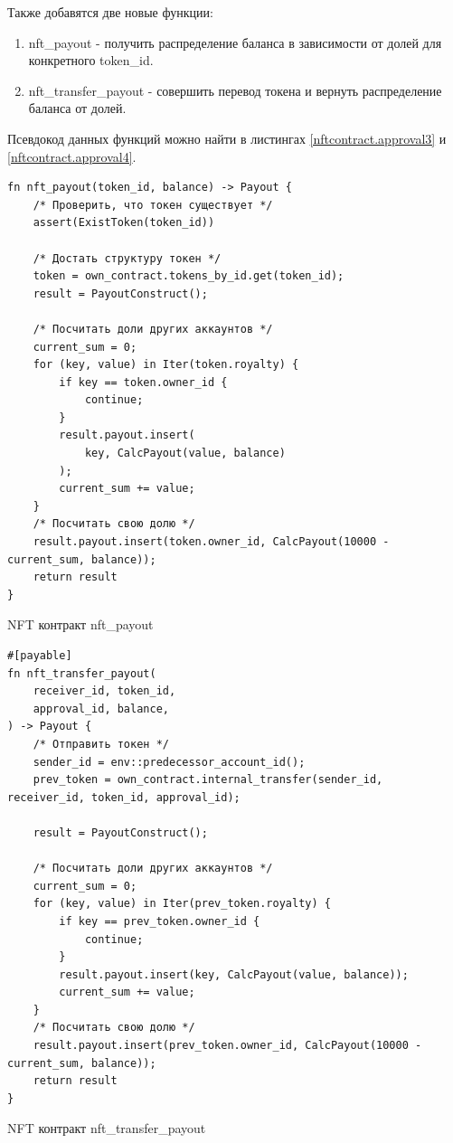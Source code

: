 Также добавятся две новые функции:
\begin{enumerate}
\item nft\_payout - получить распределение баланса в зависимости от долей для конкретного token\_id.
\item nft\_transfer\_payout - совершить перевод токена и вернуть распределение баланса от долей.
\end{enumerate}
Псевдокод данных функций можно найти в листингах {\color{blue}\ref{nftcontract.approval3}} и {\color{blue}\ref{nftcontract.approval4}}.
\begin{listing}
\begin{verbatim}
fn nft_payout(token_id, balance) -> Payout {
    /* Проверить, что токен существует */
    assert(ExistToken(token_id))

    /* Достать структуру токен */
    token = own_contract.tokens_by_id.get(token_id);
    result = PayoutConstruct();

    /* Посчитать доли других аккаунтов */
    current_sum = 0;
    for (key, value) in Iter(token.royalty) {
        if key == token.owner_id {
            continue;
        }
        result.payout.insert(
            key, CalcPayout(value, balance)
        );
        current_sum += value;
    }
    /* Посчитать свою долю */
    result.payout.insert(token.owner_id, CalcPayout(10000 - current_sum, balance));
    return result
}
\end{verbatim}
\caption{NFT контракт nft\_payout}
\label{nftcontract.approval3}
\end{listing}

\begin{listing}
\begin{verbatim}
#[payable]
fn nft_transfer_payout(
    receiver_id, token_id,
    approval_id, balance,
) -> Payout {
    /* Отправить токен */
    sender_id = env::predecessor_account_id();
    prev_token = own_contract.internal_transfer(sender_id, receiver_id, token_id, approval_id);

    result = PayoutConstruct();

    /* Посчитать доли других аккаунтов */
    current_sum = 0;
    for (key, value) in Iter(prev_token.royalty) {
        if key == prev_token.owner_id {
            continue;
        }
        result.payout.insert(key, CalcPayout(value, balance));
        current_sum += value;
    }
    /* Посчитать свою долю */
    result.payout.insert(prev_token.owner_id, CalcPayout(10000 - current_sum, balance));
    return result
}
\end{verbatim}
\caption{NFT контракт nft\_transfer\_payout}
\label{nftcontract.approval4}
\end{listing}

